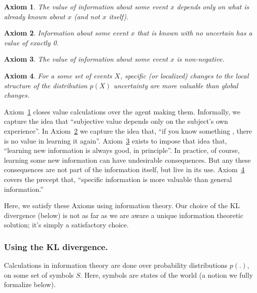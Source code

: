 \documentclass[9pt,twocolumn,twoside]{pnas-new}
\newtheorem{axiom}{Axiom}
\begin{document}
\begin{axiom}
    The value of information about some event $x$ depends \textit{only} on what is already known about $x$ (and not $x$ itself).    
    \label{ax:1}
\end{axiom}
\begin{axiom}
    Information about some event $x$ that is known with no uncertain has a value of exactly 0.
    \label{ax:2}
\end{axiom}
\begin{axiom}
    The value of information about some event $x$ is non-negative. 
    \label{ax:3}
\end{axiom}
\begin{axiom}
    For a some set of events $X$, specific (or localized) changes to the local structure of the distribution $p(X)$ uncertainty are more valuable than global changes.
    \label{ax:4}
\end{axiom}

Axiom~\ref{ax:1} closes value calculations over the agent making them. Informally, we capture the idea that ``subjective value depends only on the subject's own experience''.  In Axiom~\ref{ax:2} we capture the idea that, ``if you know something , there is no value in learning it again''. Axiom~\ref{ax:3} exists to impose that idea that, ``learning new information is always good, in principle''. In practice, of course, learning some new information can have undesirable consequences. But any these consequences are not part of the information itself, but live in its use. Axiom~\ref{ax:4} covers the precept that, ``specific information is more valuable than general information.'' 

Here, we satisfy these Axioms using information theory. Our choice of the KL divergence (below) is not as far as we are aware a unique information theoretic solution; it's simply a satisfactory choice. 

\subsubsection*{Using the KL divergence.}
Calculations in information theory are done over probability distributions $p(.)$, on some set of symbols $S$. Here, symbols are states of the world (a notion we fully formalize below). 
\end{document}
